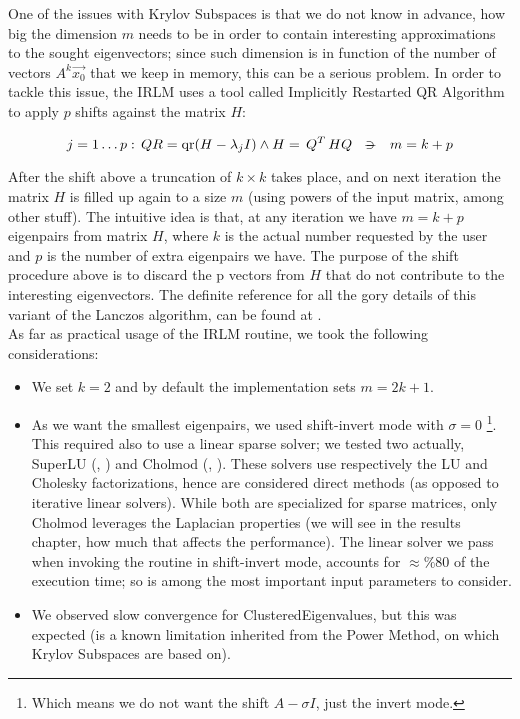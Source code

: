 One of the issues with Krylov Subspaces is that we do not know in
advance, how big the dimension $m$ needs to be in order to contain
interesting approximations to the sought eigenvectors; since such
dimension is in function of the number of vectors $A^k \vec{x_0}$ that
we keep in memory, this can be a serious problem. In order to tackle
this issue, the \gls{IRLM} uses a tool called Implicitly Restarted QR
Algorithm to apply $p$ shifts against the matrix $H$:

\begin{equation*}
    j=1 \ldots p:\, QR = \func{qr}(H - \lambda_j I) \land H = \trans{Q}HQ
    \ds{\suchthat}
    m = k + p
\end{equation*}
\joinbelow{1cm}

After the shift above a truncation of $k \times k$ takes place, and on
next iteration the matrix $H$ is filled up again to a size $m$ (using
powers of the input matrix, among other stuff). The intuitive idea is that,
at any iteration we have $m = k + p$ eigenpairs from matrix $H$, where
$k$ is the actual number requested by the user and $p$ is the number
of extra eigenpairs we have. The purpose of the shift procedure above is to 
discard the p vectors from $H$ that do not contribute to the
interesting eigenvectors. The definite reference for all the gory
details of this variant of the Lanczos algorithm, can be found at
\cite{arpack}. \\

As far as practical usage of the \gls{IRLM} routine, we took the following
considerations:

\begin{itemize}
\item We set $k=2$ and by default the implementation sets $m=2k+1$.
\item As we want the smallest eigenpairs, we used shift-invert mode
  with $\sigma=0$ \footnote{Which means we 
  do not want the shift $A - \sigma I$, just the invert mode.}. This
  required also to use a linear sparse solver; we tested two actually, \gls{SuperLU}
  (\cite{superlu97}, \cite{superlu05}) and  \gls{Cholmod} (\cite{cholmod08},
  \cite{cholmod08a}). These solvers use respectively the LU and
  Cholesky factorizations, hence are considered direct
  methods (as opposed to iterative linear solvers). While
  both are specialized for sparse matrices, only \gls{Cholmod} leverages
  the \gls{Laplacian} properties (we will see in the results chapter, how much
  that affects the performance). The linear solver we pass when invoking the
  routine in shift-invert mode, accounts for $\approx \%80$ of
  the execution time; so is among the most important input parameters
  to consider. 
\item We observed slow convergence for \gls{ClusteredEigenvalues}, but this
  was expected (is a known limitation inherited from the Power
  Method, on which Krylov Subspaces are based on).
\end{itemize}

